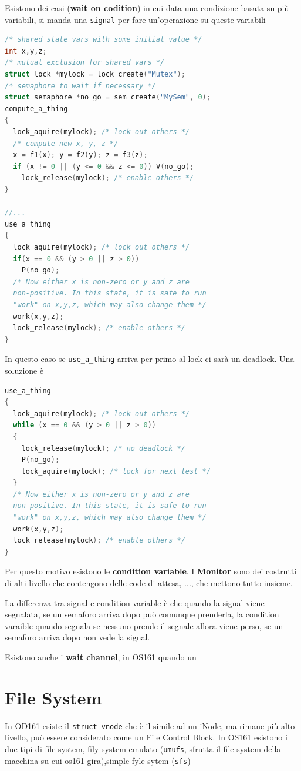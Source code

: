 \documentclass[12pt]{article}
\begin{document}
Esistono dei casi (\textbf{wait on codition}) in cui data una condizione basata su pi\`u variabili, si manda una \texttt{signal} per fare un'operazione su queste variabili
\begin{lstlisting}[language=c]
/* shared state vars with some initial value */
int x,y,z;
/* mutual exclusion for shared vars */
struct lock *mylock = lock_create("Mutex");
/* semaphore to wait if necessary */
struct semaphore *no_go = sem_create("MySem", 0);
compute_a_thing
{
  lock_aquire(mylock); /* lock out others */
  /* compute new x, y, z */
  x = f1(x); y = f2(y); z = f3(z);
  if (x != 0 || (y <= 0 && z <= 0)) V(no_go);
    lock_release(mylock); /* enable others */
}

//...
use_a_thing
{
  lock_aquire(mylock); /* lock out others */
  if(x == 0 && (y > 0 || z > 0))
    P(no_go);
  /* Now either x is non-zero or y and z are
  non-positive. In this state, it is safe to run
  "work" on x,y,z, which may also change them */
  work(x,y,z);
  lock_release(mylock); /* enable others */
}
\end{lstlisting}
In questo caso se \texttt{use\_a\_thing} arriva per primo al lock ci sar\`a un deadlock. Una soluzione \`e
\begin{lstlisting}[language=c]
use_a_thing 
{
  lock_aquire(mylock); /* lock out others */
  while (x == 0 && (y > 0 || z > 0)) 
  {
    lock_release(mylock); /* no deadlock */
    P(no_go);
    lock_aquire(mylock); /* lock for next test */
  }
  /* Now either x is non-zero or y and z are
  non-positive. In this state, it is safe to run
  "work" on x,y,z, which may also change them */
  work(x,y,z);
  lock_release(mylock); /* enable others */
}
\end{lstlisting}
Per questo motivo esistono le \textbf{condition variable}. I \textbf{Monitor} sono dei costrutti di alti livello che contengono delle code di attesa, ..., che mettono tutto insieme.

La differenza tra signal e condition variable \`e che quando la signal viene segnalata, se un semaforo arriva dopo pu\`o comunque prenderla, la condition varaible quando segnala se nessuno prende il segnale allora viene perso, se un semaforo arriva dopo non vede la signal.

Esistono anche i \textbf{wait channel}, in OS161 quando un 




\section{File System}
In OD161 esiste il \texttt{struct vnode} che \`e il simile ad un iNode, ma rimane pi\`u alto livello, pu\`o essere considerato come un File Control Block. In OS161 esistono i due tipi di file system, fily system emulato (\texttt{umufs}, sfrutta il file system della macchina su cui os161 gira),simple fyle sytem (\texttt{sfs})
\end{document}
